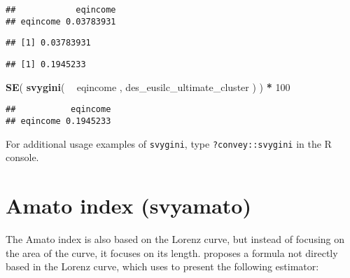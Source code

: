\documentclass[]{book}
\newenvironment{Shaded}{\begin{snugshade}}{\end{snugshade}}
\newcommand{\CommentTok}[1]{\textcolor[rgb]{0.56,0.35,0.01}{\textit{#1}}}
\newcommand{\DecValTok}[1]{\textcolor[rgb]{0.00,0.00,0.81}{#1}}
\newcommand{\KeywordTok}[1]{\textcolor[rgb]{0.13,0.29,0.53}{\textbf{#1}}}
\newcommand{\NormalTok}[1]{#1}
\newcommand{\OperatorTok}[1]{\textcolor[rgb]{0.81,0.36,0.00}{\textbf{#1}}}
\newcommand{\StringTok}[1]{\textcolor[rgb]{0.31,0.60,0.02}{#1}}
\begin{document}
\begin{verbatim}
##            eqincome
## eqincome 0.03783931
\end{verbatim}

\begin{Shaded}
\end{Shaded}

\begin{verbatim}
## [1] 0.03783931
\end{verbatim}

\begin{Shaded}
\end{Shaded}

\begin{verbatim}
## [1] 0.1945233
\end{verbatim}

\begin{Shaded}
\begin{Highlighting}[]
\KeywordTok{SE}\NormalTok{( }\KeywordTok{svygini}\NormalTok{( }\OperatorTok{~}\StringTok{ }\NormalTok{eqincome , des_eusilc_ultimate_cluster ) ) }\OperatorTok{*}\StringTok{ }\DecValTok{100}
\end{Highlighting}
\end{Shaded}

\begin{verbatim}
##           eqincome
## eqincome 0.1945233
\end{verbatim}

For additional usage examples of \texttt{svygini}, type \texttt{?convey::svygini} in the R console.

\hypertarget{amato-index-svyamato}{%
\section{Amato index (svyamato)}\label{amato-index-svyamato}}

The Amato index is also based on the Lorenz curve, but instead of focusing on the area of the curve, it focuses on its length. \citet{arnold2012} proposes a formula not directly based in the Lorenz curve, which \citet{barabesi2016} uses to present the following estimator:
\end{document}
